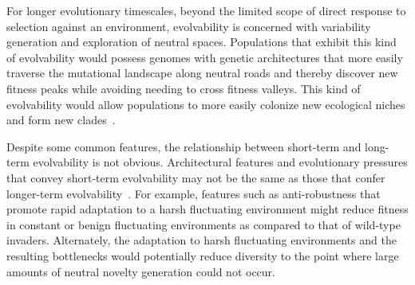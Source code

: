\documentclass[10pt,letterpaper,final]{article}
\begin{document}
For longer evolutionary timescales, beyond the limited scope of direct response to selection against an environment, 
evolvability is concerned with variability generation and exploration of neutral spaces.
Populations that exhibit this kind of evolvability would possess genomes with genetic architectures
that more easily traverse the mutational landscape along neutral roads and thereby discover new fitness peaks while avoiding needing to cross fitness valleys.
This kind of evolvability would allow populations to more easily colonize new ecological niches and form new clades~\cite{kirschner_evolvability_1998,brookfield_evolution:_2001}.

Despite some common features, the relationship between short-term and long-term evolvability is not obvious. Architectural features and evolutionary pressures that convey short-term evolvability may not be the same as those that confer longer-term evolvability~\cite{pigliucci_is_2008}. For example, features such as anti-robustness that promote rapid adaptation to a harsh fluctuating environment might reduce fitness in constant or benign fluctuating environments as compared to that of wild-type invaders. Alternately, the adaptation to harsh fluctuating environments and the resulting bottlenecks would potentially reduce diversity to the point where large amounts of neutral novelty generation could not occur. 
\end{document}

